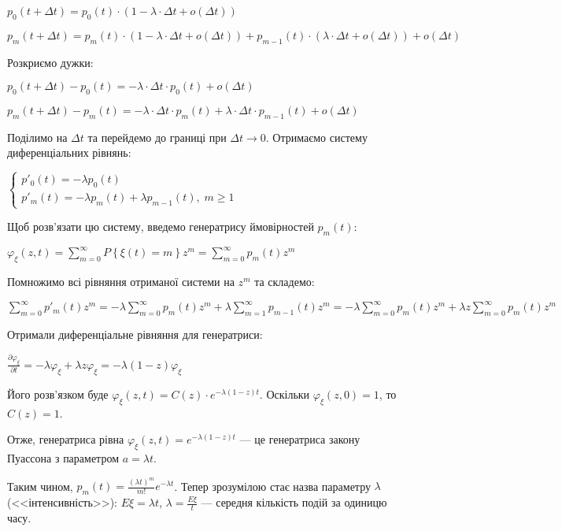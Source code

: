 $p_0(t+\Delta t) = p_0(t) \cdot (1 - \lambda \cdot \Delta t + o(\Delta t))$

$p_m(t+\Delta t) = p_m(t) \cdot (1 - \lambda \cdot \Delta t + o(\Delta t)) + p_{m-1}(t) \cdot (\lambda \cdot \Delta t + o(\Delta t)) + o(\Delta t)$

\noindent Розкриємо дужки:

$p_0(t+\Delta t) - p_0(t) = -\lambda \cdot \Delta t \cdot p_0(t) + o(\Delta t)$
\nopagebreak

$p_m(t+\Delta t) - p_m(t) = -\lambda \cdot \Delta t \cdot p_m(t) + \lambda\cdot\Delta t \cdot p_{m-1}(t) + o(\Delta t)$

\noindent Поділимо на $\Delta t$ та перейдемо до границі при $\Delta t \rightarrow 0$.
Отримаємо систему диференціальних рівнянь:

$\begin{cases}
    p'_0(t) = - \lambda p_0(t) \\
    p'_m(t) = - \lambda p_m(t) + \lambda p_{m-1}(t), \; m \geq 1
\end{cases}$

\noindent Щоб розв'язати цю систему, введемо генератрису ймовірностей $p_m(t)$:

$\varphi_\xi(z, t) = \sum\limits_{m=0}^{\infty} P\left\{\xi(t) = m\right\} z^m = \sum\limits_{m=0}^{\infty} p_m(t) z^m$ 

\noindent Помножимо всі рівняння отриманої системи на $z^m$ та складемо:

$\sum\limits_{m=0}^{\infty} p'_m(t) z^m = -\lambda \sum\limits_{m=0}^{\infty} p_m(t) z^m + \lambda \sum\limits_{m=1}^{\infty} p_{m-1}(t) z^m = 
-\lambda \sum\limits_{m=0}^{\infty} p_m(t) z^m + \lambda z \sum\limits_{m=0}^{\infty} p_{m}(t) z^m$

\noindent Отримали диференціальне рівняння для генератриси:

$\frac{\partial \varphi_\xi}{\partial t} = - \lambda \varphi_\xi + \lambda z \varphi_\xi = -\lambda(1-z) \varphi_\xi$

\noindent Його розв'язком буде $\varphi_\xi(z, t) = C(z) \cdot e^{-\lambda(1-z)t}$.
Оскільки $\varphi_\xi(z, 0) = 1$, то $C(z) = 1$.

Отже, генератриса рівна $\varphi_\xi(z, t) = e^{-\lambda(1-z)t}$ --- це генератриса закону Пуассона з параметром $a=\lambda t$.

Таким чином, $p_m(t) = \frac{(\lambda t)^m}{m!}e^{-\lambda t}$. 
Тепер зрозумілою стає назва параметру $\lambda$ (<<інтенсивність>>): $E\xi = \lambda t$, $\lambda = \frac{E\xi}{t}$ --- середня кількість подій за одиницю часу.

